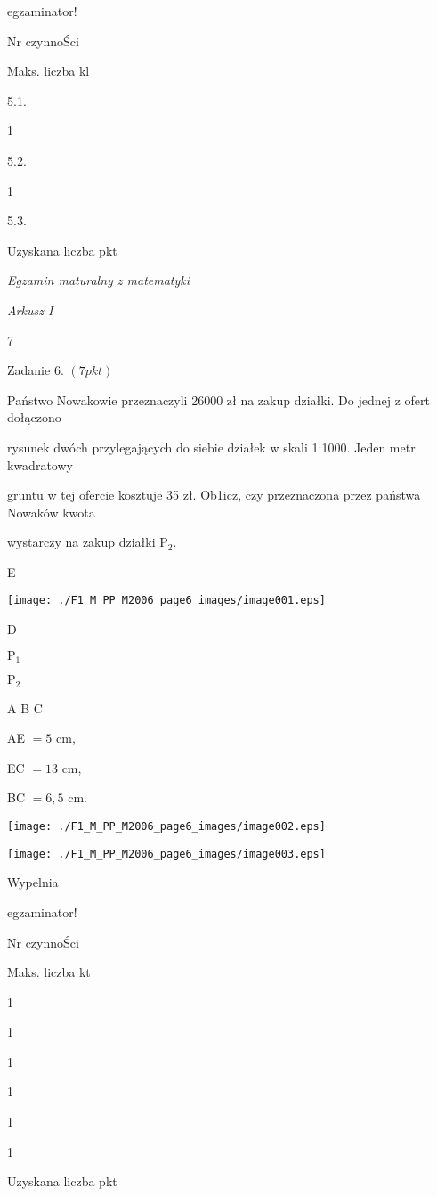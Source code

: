 \documentclass[a4paper,12pt]{article}
\begin{document}
egzaminator!

Nr czynnoŚci

Maks. liczba kl

5.1.

1

5.2.

1

5.3.

Uzyskana liczba pkt





{\it Egzamin maturalny z matematyki}

{\it Arkusz I}

7

Zadanie 6. $(7pkt)$

Państwo Nowakowie przeznaczyli 26000 zł na zakup działki. Do jednej z ofert dołączono

rysunek dwóch przylegających do siebie działek w skali 1:1000. Jeden metr kwadratowy

gruntu w tej ofercie kosztuje 35 zł. Ob1icz, czy przeznaczona przez państwa Nowaków kwota

wystarczy na zakup działki $\mathrm{P}_{2}.$

E
\begin{center}
\texttt{[image: ./F1\_M\_PP\_M2006\_page6\_images/image001.eps]}
\end{center}
D

$\mathrm{P}_{1}$

$\mathrm{P}_{2}$

A  B  C

AE $=5$ cm,

EC $=13$ cm,

BC $=6,5$ cm.
\begin{center}
\texttt{[image: ./F1\_M\_PP\_M2006\_page6\_images/image002.eps]}

\texttt{[image: ./F1\_M\_PP\_M2006\_page6\_images/image003.eps]}
\end{center}
Wypelnia

egzaminator!

Nr czynnoŚci

Maks. liczba kt

1

1

1

1

1

1

Uzyskana liczba pkt
\end{document}

